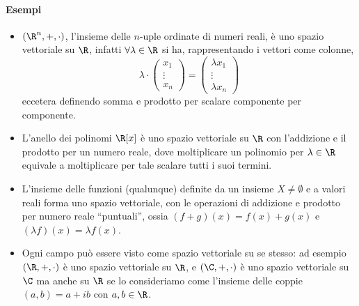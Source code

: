 \paragraph{Esempi}
\begin{itemize}
	\item $(\R^n,+,\cdot)$, l'insieme delle $n$-uple ordinate di numeri reali, è uno spazio vettoriale su $\R$, infatti $\forall\lambda\in\R$ si ha, rappresentando i vettori come colonne,
		\begin{equation*}
			\lambda\cdot
			\begin{pmatrix}
				x_1\\\vdots\\x_n
			\end{pmatrix}
			=
			\begin{pmatrix}
				\lambda x_1\\\vdots\\\lambda x_n
			\end{pmatrix}
		\end{equation*}
		eccetera definendo somma e prodotto per scalare componente per componente.
	\item L'anello dei polinomi $\R[x]$ è uno spazio vettoriale su $\R$ con l'addizione e il prodotto per un numero reale, dove moltiplicare un polinomio per $\lambda\in\R$ equivale a moltiplicare per tale scalare tutti i suoi termini.
	\item L'insieme delle funzioni (qualunque) definite da un insieme $X\ne\emptyset$ e a valori reali forma uno spazio vettoriale, con le operazioni di addizione e prodotto per numero reale ``puntuali'', ossia $(f+g)(x)=f(x)+g(x)$ e $(\lambda f)(x)=\lambda f(x)$.
	\item Ogni campo può essere visto come spazio vettoriale su se stesso: ad esempio $(\R,+,\cdot)$ è uno spazio vettoriale su $\R$, e $(\C,+,\cdot)$ è uno spazio vettoriale su $\C$ ma anche su $\R$ se lo consideriamo come l'insieme delle coppie $(a,b)=a+ib$ con $a,b\in\R$.
\end{itemize}

